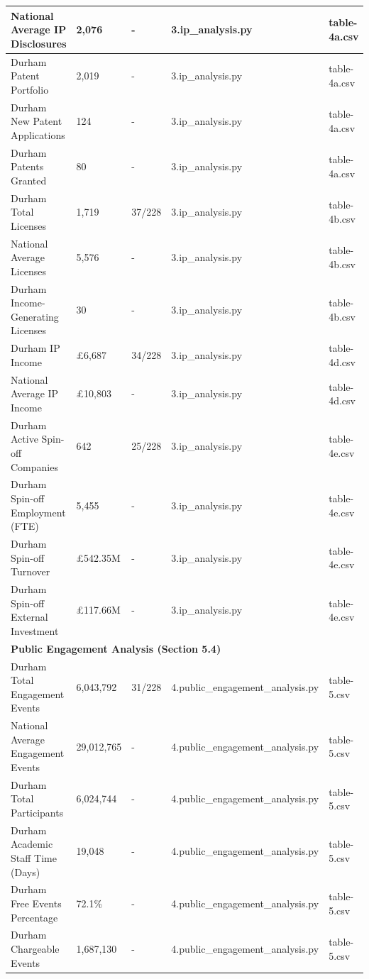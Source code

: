 \documentclass[journal,onecolumn, 10pt,draftclsnofoot]{IEEEtran}
\begin{document}
\begin{table}[h]
{\begin{tabular}{|l|l|l|l|l|}
\hline National Average IP Disclosures & 2,076 & - & 3.ip\_analysis.py & table-4a.csv \\
\hline Durham Patent Portfolio & 2,019 & - & 3.ip\_analysis.py & table-4a.csv \\
\hline Durham New Patent Applications & 124 & - & 3.ip\_analysis.py & table-4a.csv \\
\hline Durham Patents Granted & 80 & - & 3.ip\_analysis.py & table-4a.csv \\
\hline Durham Total Licenses & 1,719 & 37/228 & 3.ip\_analysis.py & table-4b.csv \\
\hline National Average Licenses & 5,576 & - & 3.ip\_analysis.py & table-4b.csv \\
\hline Durham Income-Generating Licenses & 30 & - & 3.ip\_analysis.py & table-4b.csv \\
\hline Durham IP Income & £6,687 & 34/228 & 3.ip\_analysis.py & table-4d.csv \\
\hline National Average IP Income & £10,803 & - & 3.ip\_analysis.py & table-4d.csv \\
\hline Durham Active Spin-off Companies & 642 & 25/228 & 3.ip\_analysis.py & table-4e.csv \\
\hline Durham Spin-off Employment (FTE) & 5,455 & - & 3.ip\_analysis.py & table-4e.csv \\
\hline Durham Spin-off Turnover & £542.35M & - & 3.ip\_analysis.py & table-4e.csv \\
\hline Durham Spin-off External Investment & £117.66M & - & 3.ip\_analysis.py & table-4e.csv \\
\hline \multicolumn{5}{|l|}{\textbf{Public Engagement Analysis (Section 5.4)}} \\
\hline Durham Total Engagement Events & 6,043,792 & 31/228 & 4.public\_engagement\_analysis.py & table-5.csv \\
\hline National Average Engagement Events & 29,012,765 & - & 4.public\_engagement\_analysis.py & table-5.csv \\
\hline Durham Total Participants & 6,024,744 & - & 4.public\_engagement\_analysis.py & table-5.csv \\
\hline Durham Academic Staff Time (Days) & 19,048 & - & 4.public\_engagement\_analysis.py & table-5.csv \\
\hline Durham Free Events Percentage & 72.1\% & - & 4.public\_engagement\_analysis.py & table-5.csv \\
\hline Durham Chargeable Events & 1,687,130 & - & 4.public\_engagement\_analysis.py & table-5.csv \\

\end{tabular}}
\end{table}
\end{document}
